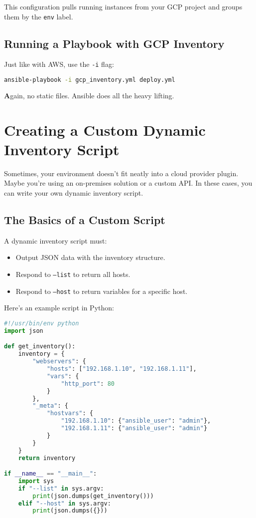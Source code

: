 This configuration pulls running instances from your GCP project and groups them by the \texttt{env} label.

\subsection{Running a Playbook with GCP Inventory}

Just like with AWS, use the \texttt{-i} flag:
\begin{lstlisting}[language=bash, caption=Running a Playbook with GCP Inventory]
ansible-playbook -i gcp_inventory.yml deploy.yml
\end{lstlisting}

\textbf{A}gain, no static files. Ansible does all the heavy lifting.


\section{Creating a Custom Dynamic Inventory Script}

Sometimes, your environment doesn't fit neatly into a cloud provider plugin. Maybe you're using an on-premises solution or a custom API. In these cases, you can write your own dynamic inventory script.

\subsection{The Basics of a Custom Script}

A dynamic inventory script must:
\begin{itemize}
    \item Output JSON data with the inventory structure.
    \item Respond to \texttt{--list} to return all hosts.
    \item Respond to \texttt{--host} to return variables for a specific host.
\end{itemize}

Here's an example script in Python:
\begin{lstlisting}[language=python, caption=Custom Inventory Script]
#!/usr/bin/env python
import json

def get_inventory():
    inventory = {
        "webservers": {
            "hosts": ["192.168.1.10", "192.168.1.11"],
            "vars": {
                "http_port": 80
            }
        },
        "_meta": {
            "hostvars": {
                "192.168.1.10": {"ansible_user": "admin"},
                "192.168.1.11": {"ansible_user": "admin"}
            }
        }
    }
    return inventory

if __name__ == "__main__":
    import sys
    if "--list" in sys.argv:
        print(json.dumps(get_inventory()))
    elif "--host" in sys.argv:
        print(json.dumps({}))
\end{lstlisting}

